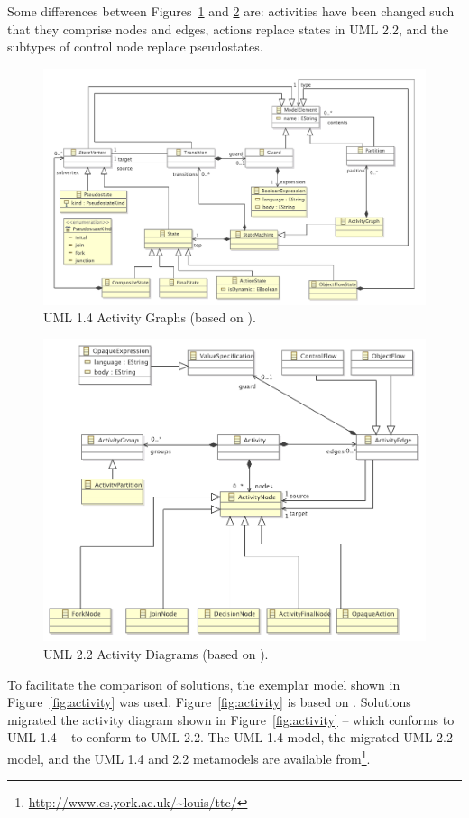 Some differences between Figures~\ref{fig:uml14} and \ref{fig:uml22} are: activities have been changed such that they comprise nodes and edges, actions replace states in UML 2.2, and the subtypes of control node replace pseudostates.

\begin{figure}[htbp]
  \centering
  \includegraphics[width=12cm]{6.Evaluation/images/uml14.pdf}
  \caption{UML 1.4 Activity Graphs (based on \cite{uml14}).}
  \label{fig:uml14}
\end{figure}
 

\begin{figure}[htbp]
  \centering
  \includegraphics[width=12cm]{6.Evaluation/images/uml22.pdf}
  \caption{UML 2.2 Activity Diagrams (based on \cite{uml22}).}
  \label{fig:uml22}
\end{figure}

To facilitate the comparison of solutions, the exemplar model shown in Figure~\ref{fig:activity} was used. Figure~\ref{fig:activity} is based on \cite[pg3-165]{uml14}. Solutions migrated the activity diagram shown in Figure~\ref{fig:activity} -- which conforms to UML 1.4 -- to conform to UML 2.2. The UML 1.4 model, the migrated UML 2.2 model, and the UML 1.4 and 2.2 metamodels are available from\footnote{\url{http://www.cs.york.ac.uk/~louis/ttc/}}.

